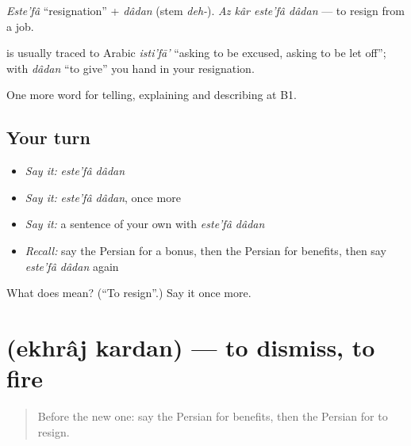 \emph{Este'fâ} \textquotedblleft{}resignation\textquotedblright{} + \emph{dâdan} (stem \emph{deh-}). \emph{Az kâr este'fâ dâdan} — to resign from a job.

\begin{cousinweb}
\textbf{} is usually traced to Arabic \emph{isti'fā'} \textquotedblleft{}asking to be excused, asking to be let off\textquotedblright{}; with \emph{dâdan} \textquotedblleft{}to give\textquotedblright{} you hand in your resignation.
\end{cousinweb}

\begin{grammarlens}[title={What you've built}]
One more word for telling, explaining and describing at B1.
\end{grammarlens}

\subsection*{Your turn}
\begin{itemize}
\raggedright
  \item \emph{Say it:} \emph{este'fâ dâdan}
  \item \emph{Say it:} \emph{este'fâ dâdan}, once more
  \item \emph{Say it:} a sentence of your own with \emph{este'fâ dâdan}
  \item \emph{Recall:} say the Persian for a bonus, then the Persian for benefits, then say \emph{este'fâ dâdan} again
\end{itemize}

\begin{tcolorbox}[breakable,colback=teal!4,colframe=teal!35!black,title={Before you move on}]
What does   mean? (\textquotedblleft{}To resign\textquotedblright{}.) Say it once more.
\end{tcolorbox}
\section[\texorpdfstring{\fa{اخراج} \fa{کردن} (ekhrâj kardan)}{اخراج کردن (ekhrâj kardan)}]{  (ekhrâj kardan) — to dismiss, to fire}

\label{lesson:FA-C379-ekhraj-kardan}



\begin{quote}
Before the new one: say the Persian for benefits, then the Persian for to resign.
\end{quote}

